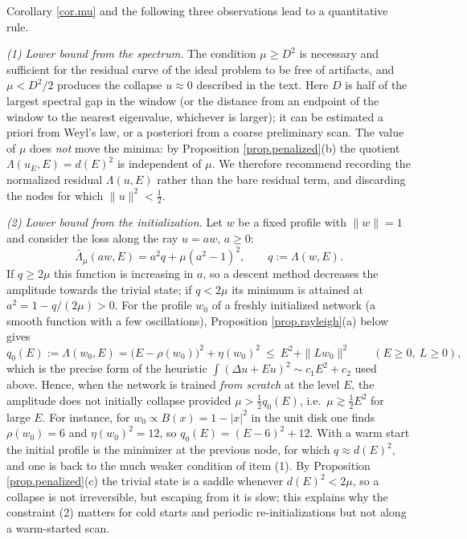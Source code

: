 \begin{remark}\label{rem.mu}
Corollary \ref{cor.mu} and the following three observations lead to a quantitative rule.

\emph{(1) Lower bound from the spectrum.} The condition $\mu\ge D^2$ is necessary and
sufficient for the residual curve of the ideal problem to be free of artifacts, and
$\mu<D^2/2$ produces the collapse $u\approx0$ described in the text. Here $D$ is half of
the largest spectral gap in the window (or the distance from an endpoint of the window to
the nearest eigenvalue, whichever is larger); it can be estimated a priori from Weyl's
law, or a posteriori from a coarse preliminary scan. The value of $\mu$ does \emph{not}
move the minima: by Proposition \ref{prop.penalized}(b) the quotient
$\Lambda(u_E,E)=d(E)^2$ is independent of $\mu$. We therefore recommend recording the
normalized residual $\Lambda(u,E)$ rather than the bare residual term, and discarding the
nodes for which $\|u\|^2<\frac12$.

\emph{(2) Lower bound from the initialization.} Let $w$ be a fixed profile with $\|w\|=1$
and consider the loss along the ray $u=aw$, $a\ge0$:
\[
\bar\Lambda_\mu(aw,E)=a^2q+\mu(a^2-1)^2,\qquad q:=\Lambda(w,E).
\]
If $q\ge2\mu$ this function is increasing in $a$, so a descent method decreases the
amplitude towards the trivial state; if $q<2\mu$ its minimum is attained at
$a^2=1-q/(2\mu)>0$. For the profile $w_0$ of a freshly initialized network (a smooth
function with a few oscillations), Proposition \ref{prop.rayleigh}(a) below gives
\[
q_0(E):=\Lambda(w_0,E)=\big(E-\rho(w_0)\big)^2+\eta(w_0)^2\ \le\ E^2+\|Lw_0\|^2
\qquad(E\ge0,\ L\ge0),
\]
which is the precise form of the heuristic
$\int(\Delta u+Eu)^2\sim c_1E^2+c_2$ used above. Hence, when the network is trained
\emph{from scratch} at the level $E$, the amplitude does not initially collapse provided
$\mu>\frac12q_0(E)$, i.e.\ $\mu\gtrsim\frac12E^2$ for large $E$. For instance, for
$w_0\propto B(x)=1-|x|^2$ in the unit disk one finds $\rho(w_0)=6$ and
$\eta(w_0)^2=12$, so $q_0(E)=(E-6)^2+12$. With a warm start the initial profile is the
minimizer at the previous node, for which $q\approx d(E)^2$, and one is back to the much
weaker condition of item (1). By Proposition \ref{prop.penalized}(c) the trivial state is a
saddle whenever $d(E)^2<2\mu$, so a collapse is not irreversible, but escaping from it is
slow; this explains why the constraint (2) matters for cold starts and periodic
re-initializations but not along a warm-started scan.


\end{remark}
